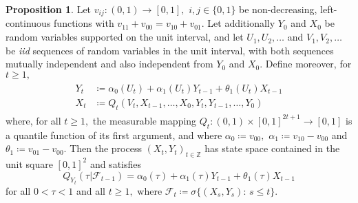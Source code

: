 \documentclass[12pt,fleqn]{article}
\theoremstyle{definition}
\newtheorem{proposition}{Proposition}
\newcommand{\range}{\operatorname{range}}
\newcommand{\FF}{\mathscr{F}}
\renewcommand{\le}{\leqslant}
\renewcommand{\ge}{\geqslant}
\newcommand{\Z}{\mathbb{Z}}
\begin{document}
\begin{proposition} \label{prop:vertices}
Let $v_{ij}\colon(0,1)\to[0,1],$ $i,j\in\{0,1\}$ be non-decreasing, left-continuous functions with
\begin{math}v_{11}+v_{00} = v_{10} + v_{01}.\end{math} Let additionally $Y_0$ and $X_0$ be random variables supported on the unit interval, and let $U_1, U_2, \dots$ and $V_1, V_2, \dots$ be \emph{iid} sequences of random variables in the unit interval, with both sequences mutually independent and also independent from $Y_0$ and $X_0.$ Define moreover, for $t\ge1,$
\begin{align}
\begin{split}\label{eq:construction}
Y_t & \coloneqq \alpha_0(U_t) + \alpha_1(U_t)Y_{t-1} + \theta_1(U_t)X_{t-1} \\[2pt]
X_t &\coloneqq Q_t(V_t, X_{t-1},\dots, X_{0}, Y_t, Y_{t-1},\dots, Y_0)
\end{split}
\end{align}
where, for all $t\ge1,$ the measurable mapping $Q_t\colon(0,1)\times[0,1]^{2t+1}\to[0,1]$ is a quantile function of its first argument, and where $\alpha_{0} \coloneqq v_{00},$ $\alpha_{1} \coloneqq v_{10} - v_{00}$ and $\theta_{1} \coloneqq v_{01} - v_{00}.$
Then the process $(X_t,Y_t)_{t\in\Z}$ has state space contained in the unit square $[0,1]^2$ and satisfies
\begin{equation}\label{prop:eq:qadl1}
Q_{Y_t}(\tau|\FF_{t-1}) = \alpha_0(\tau) + \alpha_1(\tau)Y_{t-1} + \theta_1(\tau)X_{t-1}
\end{equation}
for all $0<\tau<1$ and all $t\ge1,$ where $\FF_t \coloneqq \sigma\{(X_s,Y_s)\colon\,s\le t\}.$
\end{proposition}
\end{document}
